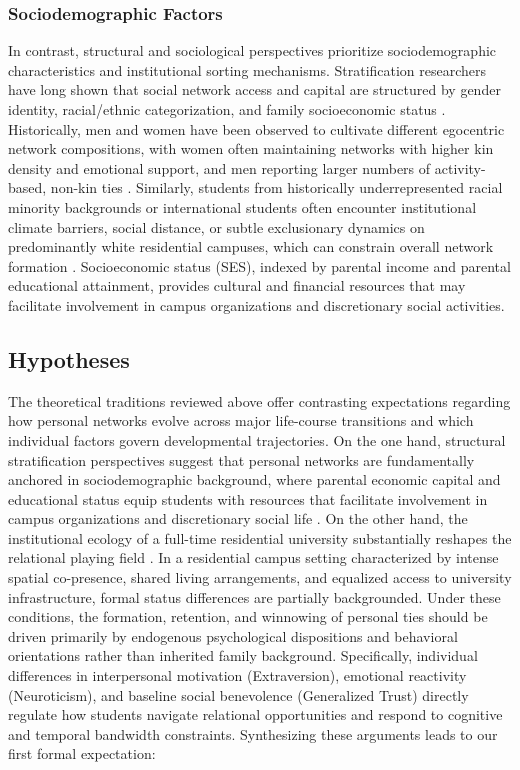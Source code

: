 \documentclass[12pt]{article}
\begin{document}
\subsubsection{Sociodemographic Factors}
In contrast, structural and sociological perspectives prioritize sociodemographic characteristics and institutional sorting mechanisms. Stratification researchers have long shown that social network access and capital are structured by gender identity, racial/ethnic categorization, and family socioeconomic status \citep{campbell1991name, lin2001social, marsden1987core}. Historically, men and women have been observed to cultivate different egocentric network compositions, with women often maintaining networks with higher kin density and emotional support, and men reporting larger numbers of activity-based, non-kin ties \citep{moore1990structural}. Similarly, students from historically underrepresented racial minority backgrounds or international students often encounter institutional climate barriers, social distance, or subtle exclusionary dynamics on predominantly white residential campuses, which can constrain overall network formation \citep{hurtado1998enhancing, vacca2020structure}. Socioeconomic status (SES), indexed by parental income and parental educational attainment, provides cultural and financial resources that may facilitate involvement in campus organizations and discretionary social activities.

\subsection{Hypotheses}

The theoretical traditions reviewed above offer contrasting expectations regarding how personal networks evolve across major life-course transitions and which individual factors govern developmental trajectories. On the one hand, structural stratification perspectives suggest that personal networks are fundamentally anchored in sociodemographic background, where parental economic capital and educational status equip students with resources that facilitate involvement in campus organizations and discretionary social life \citep{campbell1991name, dimaggio2011how-2b9, marsden1987core}. On the other hand, the institutional ecology of a full-time residential university substantially reshapes the relational playing field \citep{feld1982social, small2009unanticipated}. In a residential campus setting characterized by intense spatial co-presence, shared living arrangements, and equalized access to university infrastructure, formal status differences are partially backgrounded. Under these conditions, the formation, retention, and winnowing of personal ties should be driven primarily by endogenous psychological dispositions and behavioral orientations rather than inherited family background. Specifically, individual differences in interpersonal motivation (Extraversion), emotional reactivity (Neuroticism), and baseline social benevolence (Generalized Trust) directly regulate how students navigate relational opportunities and respond to cognitive and temporal bandwidth constraints. Synthesizing these arguments leads to our first formal expectation:
\end{document}
